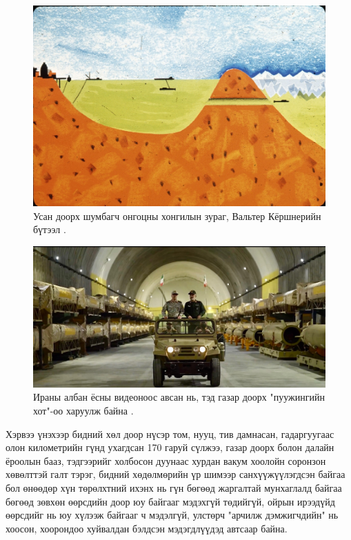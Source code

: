 \documentclass[10pt,twocolumn,letterpaper]{article}
\begin{document}
\begin{figure}[t]
\begin{center}
   \includegraphics[width=1\linewidth]{sub.jpg}
\end{center}
   \caption{Усан доорх шумбагч онгоцны хонгилын зураг, Вальтер Кёршнерийн бүтээл \cite{22,23}.}
\label{fig:6}
\label{fig:onecol}
\end{figure}
\begin{figure}[t]
\begin{center}
   \includegraphics[width=1\linewidth]{iran.jpeg}
\end{center}
   \caption{Ираны албан ёсны видеоноос авсан нь, тэд газар доорх "пуужингийн хот"-оо харуулж байна \cite{39,40}.}
\label{fig:12}
\label{fig:onecol}
\end{figure}

Хэрвээ үнэхээр бидний хөл доор нүсэр том, нууц, тив дамнасан, гадаргуугаас олон километрийн гүнд ухагдсан 170 гаруй  сүлжээ, газар доорх болон далайн ёроолын бааз, тэдгээрийг холбосон дуунаас хурдан вакум хоолойн соронзон хөвөлттэй галт тэрэг, бидний хөдөлмөрийн үр шимээр санхүүжүүлэгдсэн байгаа бол өнөөдөр хүн төрөлхтний ихэнх нь гүн бөгөөд жаргалтай мунхаглалд байгаа бөгөөд зөвхөн өөрсдийн доор юу байгааг мэдэхгүй төдийгүй, ойрын ирээдүйд өөрсдийг нь юу хүлээж байгааг ч мэдэлгүй, улстөрч "арчилж дэмжигчдийн" нь хоосон, хоорондоо хуйвалдан бэлдсэн мэдэгдлүүдэд автсаар байна.
\end{document}

